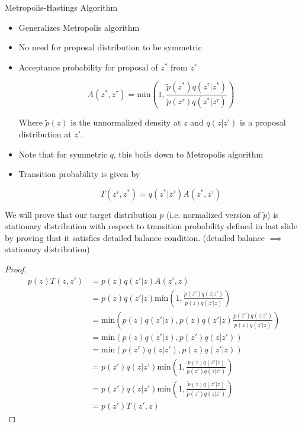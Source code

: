 \documentclass[pdf]{beamer}
\begin{document}
\begin{frame}{Metropolis-Hastings Algorithm}
  \begin{itemize}
  \item Generalizes Metropolis algorithm
  \item No need for proposal distribution to be symmetric
  \item Acceptance probability for proposal of $z^*$ from $z^\tau$

    \[
      A(z^*, z^\tau) = \text{min} \left( 1, \frac{\tilde{p}(z^*) q(z^\tau|z^*)}{\tilde{p}(z^\tau) q(z^*|z^\tau)} \right)
    \]

    Where $\tilde{p}(z)$ is the unnormalized density at $z$ and $q(z|z')$ is a proposal distribution at $z'$.
  \item Note that for symmetric $q$, this boils down to Metropolis algorithm
  \item Transition probability is given by

    \[
      T(z^\tau, z^*) = q(z^*|z^\tau) A(z^*, z^\tau)
    \]
    
  \end{itemize}
\end{frame}

\begin{frame}
  We will prove that our target distribution $p$ (i.e. normalized version of $\tilde{p}$) is stationary distribution with respect to transition probability defined in last slide by proving that it satisfies detailed balance condition. (detailed balance $\implies$ stationary distribution)

\end{frame}
\begin{frame}
  \begin{proof}
    \begin{align*}
      p(z)T(z, z') &= p(z) q(z'|z) A(z', z) \\
                   &= p(z) q(z'|z)  \text{min} \left( 1, \frac{\tilde{p}(z') q(z|z')}{\tilde{p}(z) q(z'|z)} \right) \\
                   &= \text{min} \left( p(z) q(z'|z) , p(z) q(z'|z) \frac{\tilde{p}(z') q(z|z')}{\tilde{p}(z) q(z'|z)} \right) \\
                   &= \text{min} ( p(z) q(z'|z) , p(z') q(z|z')) \\
                   &= \text{min} ( p(z') q(z|z') , p(z) q(z'|z)) \\
                   &=  p(z') q(z|z') \text{min} \left(1 , \frac{p(z) q(z'|z)}{p(z') q(z|z')}\right) \\
                   &=  p(z') q(z|z') \text{min} \left(1 , \frac{\tilde{p}(z) q(z'|z)}{\tilde{p}(z') q(z|z')}\right)\\
                   &= p(z') T(z', z)
    \end{align*}
  \end{proof}
\end{frame}
\end{document}

